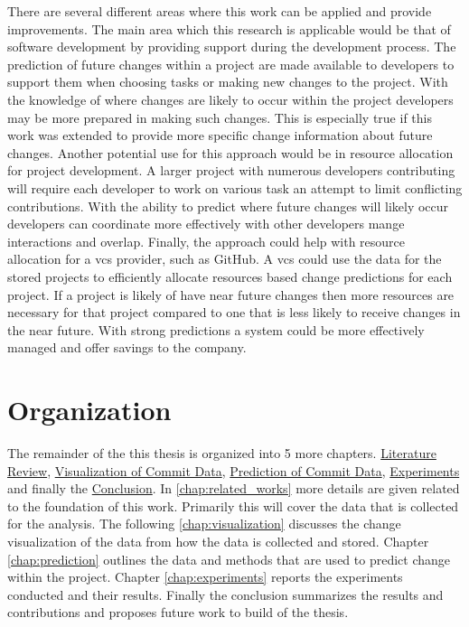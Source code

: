 There are several different areas where this work can be applied and provide improvements. The main area which this research is applicable would be that of software development by providing support during the development process. The prediction of future changes within a project are made available to developers to support them when choosing tasks or making new changes to the project. With the knowledge of where changes are likely to occur within the project developers may be more prepared in making such changes. This is especially true if this work was extended to provide more specific change information about future changes. Another potential use for this approach would be in resource allocation for project development. A larger project with numerous developers contributing will require each developer to work on various task an attempt to limit conflicting contributions. With the ability to predict where future changes will likely occur developers can coordinate more effectively with other developers mange interactions and overlap. Finally, the approach could help with resource allocation for a \gls{vcs} provider, such as GitHub. A \gls{vcs} could use the data for the stored projects to efficiently allocate resources based change predictions for each project. If a project is likely of have near future changes then more resources are necessary for that project compared to one that is less likely to receive changes in the near future. With strong predictions a system could be more effectively managed and offer savings to the company.

\section{Organization}

The remainder of the this thesis is organized into 5 more chapters. \hyperref[chap:related_works]{Literature Review}, \hyperref[chap:visualization]{Visualization of Commit Data}, \hyperref[chap:prediction]{Prediction of Commit Data}, \hyperref[chap:experiments]{Experiments} and finally the \hyperref[chap:conclusions]{Conclusion}. In \autoref{chap:related_works} more details are given related to the foundation of this work. Primarily this will cover the data that is collected for the analysis. The following \autoref{chap:visualization} discusses the change visualization of the data from how the data is collected and stored. Chapter \ref{chap:prediction} outlines the data and methods that are used to predict change within the project. Chapter \ref{chap:experiments} reports the experiments conducted and their results. Finally the conclusion summarizes the results and contributions and proposes future work to build of the thesis.
